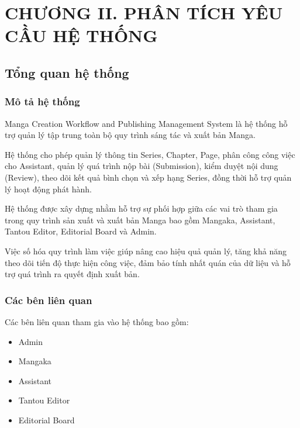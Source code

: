 \documentclass[12pt,a4paper]{article}
\begin{document}
\section{CHƯƠNG II. PHÂN TÍCH YÊU CẦU HỆ THỐNG}

\subsection{Tổng quan hệ thống}

\subsubsection{Mô tả hệ thống}
Manga Creation Workflow and Publishing Management System là hệ thống hỗ trợ quản lý tập trung toàn bộ quy trình sáng tác và xuất bản Manga.

Hệ thống cho phép quản lý thông tin Series, Chapter, Page, phân công công việc cho Assistant, quản lý quá trình nộp bài (Submission), kiểm duyệt nội dung (Review), theo dõi kết quả bình chọn và xếp hạng Series, đồng thời hỗ trợ quản lý hoạt động phát hành.

Hệ thống được xây dựng nhằm hỗ trợ sự phối hợp giữa các vai trò tham gia trong quy trình sản xuất và xuất bản Manga bao gồm Mangaka, Assistant, Tantou Editor, Editorial Board và Admin.

Việc số hóa quy trình làm việc giúp nâng cao hiệu quả quản lý, tăng khả năng theo dõi tiến độ thực hiện công việc, đảm bảo tính nhất quán của dữ liệu và hỗ trợ quá trình ra quyết định xuất bản.

\subsubsection{Các bên liên quan}
Các bên liên quan tham gia vào hệ thống bao gồm:
\begin{itemize}[noitemsep]
    \item Admin
    \item Mangaka
    \item Assistant
    \item Tantou Editor
    \item Editorial Board
\end{itemize}
\end{document}
